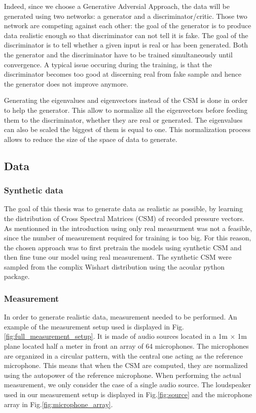 \documentclass{article}
\begin{document}
Indeed, since we choose a Generative Adversial Approach, the data will be generated using two networks: a generator and a discriminator/critic. Those two network are competing against each other: the goal of the generator is to produce data realistic enough so that discriminator can not tell it is fake. The goal of the discriminator is to tell whether a given input is real or has been generated. Both the generator and the discriminator have to be trained simultaneously until convergence. A typical issue occuring during the training, is that the discriminator becomes too good at discerning real from fake sample and hence the generator does not improve anymore.

Generating the eigenvalues and eigenvectors instead of the CSM is done in order to help the generator. This allow to normalize all the eigenvectors before feeding them to the discriminator, whether they are real or generated. The eigenvalues can also be scaled the biggest of them is equal to one. This normalization process allows to reduce the size of the space of data to generate.



\subsection{Data}

\subsubsection{Synthetic data}

The goal of this thesis was to generate data as realistic as possible, by learning the distribution of Cross Spectral Matrices (CSM) of recorded pressure vectors. As mentionned in the introduction using only real measurment was not a feasible, since the number of measurement required for training is too big. For this reason, the chosen approach was to first pretrain the models using synthetic CSM and then fine tune our model using real measurement. The synthetic CSM were sampled from the complix Wishart distribution using the acoular python package.


 

\subsubsection{Measurement}

In order to generate realistic data, measurement needed to be performed. An example of the measurement setup used is displayed in Fig.\ref{fig:full_measurement_setup}. It is made of audio sources located in a 1m $\times$ 1m plane located half a meter in front an array of 64 microphones. The microphones are organized in a circular pattern, with the central one acting as the reference microphone. This means that when the CSM are computed, they are normalized using the autopower of the reference microphone. When performing the actual measurement, we only consider the case of a single audio source. The loudspeaker used in our measurement setup is displayed in Fig.\ref{fig:source} and the microphone array in Fig.\ref{fig:microphone_array}.
\end{document}
